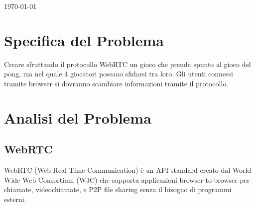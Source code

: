 \documentclass[11pt, a4paper, titlepage, block]{article}
\begin{document}
\begin{titlepage}
		{\today}\\[1cm]



		\newpage
		\tableofcontents
		

	\end{titlepage}

	\section{Specifica del Problema}
Creare sfruttando il protocollo WebRTC un gioco che prenda spunto al gioco del pong, ma nel quale 4 giocatori possano sfidarsi tra loro. Gli utenti connessi tramite browser si dovranno scambiare informazioni tramite il protocollo.
\newpage
	\section{Analisi del Problema}
     \subsection{WebRTC}
     WebRTC (Web Real-Time Communication) \`e un API standard creato dal World Wide Web Consortium (W3C) che    supporta  applicazioni browser-to-browser per chiamate, videochiamate, e P2P file sharing senza il bisogno di programmi esterni.\\
    
\end{document}
